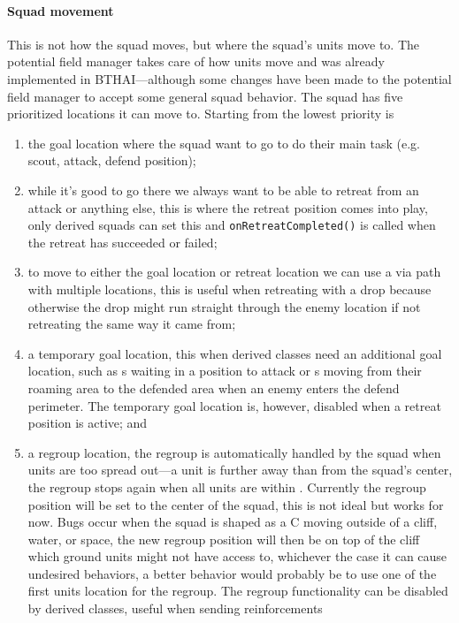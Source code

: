 \paragraph{Squad movement}
This is not how the squad moves, but where the squad's units move to. The potential field manager takes care of how units move and was already implemented in BTHAI—although some changes have been made to the potential field manager to accept some general squad behavior. The squad has five prioritized locations it can move to. Starting from the lowest priority is
\begin{enumerate}
	\item the goal location where the squad want to go to do their main task (e.g. scout, attack, defend position);
	\item while it's good to go there we always want to be able to retreat from an attack or anything else, this is where the retreat position comes into play, only derived squads can set this and \texttt{onRetreatCompleted()} is called when the retreat has succeeded or failed;
	\item to move to either the goal location or retreat location we can use a via path with multiple locations, this is useful when retreating with a drop because otherwise the drop might run straight through the enemy location if not retreating the same way it came from;
	\item a temporary goal location, this when derived classes need an additional goal location, such as s waiting in a position to attack or s moving from their roaming area to the defended area when an enemy enters the defend perimeter. The temporary goal location is, however, disabled when a retreat position is active; and
	\item a regroup location, the regroup is automatically handled by the squad when units are too spread out—a unit is further away than \squadRegroupDistanceBegin from the squad's center, the regroup stops again when all units are within \squadRegroupDistanceEnd. Currently the regroup position will be set to the center of the squad, this is not ideal but works for now. Bugs occur when the squad is shaped as a C moving outside of a cliff, water, or space, the new regroup position will then be on top of the cliff which ground units might not have access to, whichever the case it can cause undesired behaviors, a better behavior would probably be to use one of the first units location for the regroup. The regroup functionality can be disabled by derived classes, useful when sending reinforcements 
\end{enumerate}

